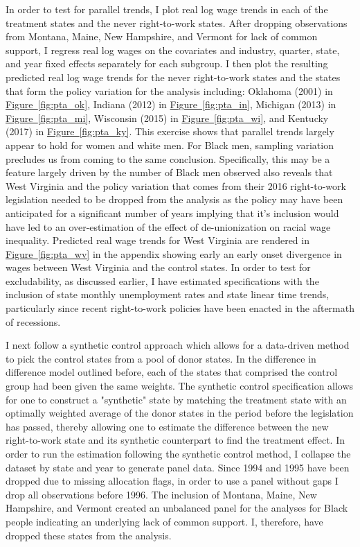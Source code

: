 \documentclass[11pt]{article}
\begin{document}
In order to test for parallel trends, I plot real log wage trends in each of the treatment states and the never right-to-work states. After dropping observations from Montana, Maine, New Hampshire, and Vermont for lack of common support, I regress real log wages on the covariates and industry, quarter, state, and year fixed effects separately for each subgroup. I then plot the resulting predicted real log wage trends for the never right-to-work states and the states that form the policy variation for the analysis including: Oklahoma (2001) in \hyperref[fig:pta_ok]{Figure~\ref*{fig:pta_ok}}, Indiana (2012) in \hyperref[fig:pta_in]{Figure~\ref*{fig:pta_in}}, Michigan (2013) in \hyperref[fig:pta_mi]{Figure~\ref*{fig:pta_mi}}, Wisconsin (2015) in \hyperref[fig:pta_wi]{Figure~\ref*{fig:pta_wi}}, and Kentucky (2017) in \hyperref[fig:pta_ky]{Figure~\ref*{fig:pta_ky}}. This exercise shows that parallel trends largely appear to hold for women and white men. For Black men, sampling variation precludes us from coming to the same conclusion. Specifically, this may be a feature largely driven by the number of Black men observed also reveals that West Virginia and the policy variation that comes from their 2016 right-to-work legislation needed to be dropped from the analysis as the policy may have been anticipated for a significant number of years implying that it's inclusion would have led to an over-estimation of the effect of de-unionization on racial wage inequality. Predicted real wage trends for West Virginia are rendered in \hyperref[fig:pta_wv]{Figure~\ref*{fig:pta_wv}} in the appendix showing early an early onset divergence in wages between West Virginia and the control states. In order to test for excludability, as discussed earlier, I have estimated specifications with the inclusion of state monthly unemployment rates and state linear time trends, particularly since recent right-to-work policies have been enacted in the aftermath of recessions.

I next follow a synthetic control approach which allows for a data-driven method to pick the control states from a pool of donor states. In the difference in difference model outlined before, each of the states that comprised the control group had been given the same weights. The synthetic control specification allows for one to construct a "synthetic" state by matching the treatment state with an optimally weighted average of the donor states in the period before the legislation has passed, thereby allowing one to estimate the difference between the new right-to-work state and its synthetic counterpart to find the treatment effect. In order to run the estimation following the synthetic control method, I collapse the dataset by state and year to generate panel data. Since 1994 and 1995 have been dropped due to missing allocation flags, in order to use a panel without gaps I drop all observations before 1996. The inclusion of Montana, Maine, New Hampshire, and Vermont created an unbalanced panel for the analyses for Black people indicating an underlying lack of common support. I, therefore, have dropped these states from the analysis. 
\end{document}
